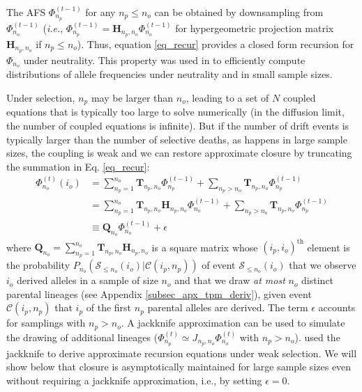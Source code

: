 \documentclass[review,nonatbib]{elsarticle}
\newcommand{\afs}[2]{\Phi_{#1}^{(#2)}}
\newcommand{\ms}{\mathcal{S}}
\begin{document}
The AFS  $\afs{n_p}{t-1}$ for any  $n_p\leq n_o$ can be obtained by downsampling from $\afs{n_o}{t-1}$ (\textit{i.e.}, $\afs{n_p}{t-1} =
\mathbf{H}_{n_p,n_o} \afs{n_o}{t-1}$ for hypergeometric projection matrix $\mathbf{H}_{n_p,n_o}$ if
$n_p\leq n_o$). Thus, equation \eqref{eq_recur} provides a closed form recursion for $\Phi_{n_o}$ under neutrality.
This property was used in \cite{JouganousEtAl2017} to efficiently compute distributions of allele
frequencies under neutrality and in small sample sizes.

Under selection, $n_{p}$ may be larger than $n_o$, leading to a set of $N$ coupled equations that is
typically too large to solve numerically (in the diffusion limit, the number of coupled equations is
infinite). But if the number of drift events is typically larger than the number of selective
deaths, as happens in large sample sizes, the coupling is weak and we can restore approximate
closure by truncating the summation in Eq. \ref{eq_recur}:
\begin{equation}
\begin{split}
  \afs{n_o}{t}(i_o)
  &= \sum_{n_p=1}^{n_{o}} \mathbf{T}_{n_p,n_o}  \afs{n_p}{t-1}+ \sum_{n_p> n_o }  \mathbf{T}_{n_p,n_o} \afs{n_p}{t-1} \\
  &=      \sum_{n_p=1}^{n_{o}} \mathbf{T}_{n_p,n_o} \mathbf{H}_{n_p,n_o} \afs{n_o}{t-1}+ \sum_{n_p> n_o }  \mathbf{T}_{n_p,n_o} \afs{n_p}{t-1} \\
  &\equiv \mathbf{Q}_{n_o}                                               \afs{n_o}{t-1}+\epsilon
\end{split}
\label{eq_truncated}
\end{equation}
where $\mathbf{Q}_{n_o} =  \sum_{n_p=1}^{n_{o}} \mathbf{T}_{n_p,n_o} \mathbf{H}_{n_p,n_o}$ is a square matrix
whose $(i_p,i_o)^\text{th}$ element is the probability
$P_{n_o}(\mathcal{S}_{\leq n_o} (i_o)| \mathcal{C}(i_p,n_p))$ of event $\ms_{\leq n_o}(i_o)$ that we observe $i_o$ derived alleles in
a sample of size $n_o$ and that we draw \emph{at most} $n_o$ distinct parental lineages (see Appendix \ref{subsec_apx_tpm_deriv}), 
given event $\mathcal{C}(i_p,n_p)$ that $i_p$ of the first $n_p$ parental alleles are derived.
The term $\epsilon$ accounts for samplings with $n_p>n_o.$ A jackknife approximation \citep{Gravel2016} can be used to simulate the drawing of additional lineages
($\afs{n_p}{t} \simeq J_{n_p,n_o} \afs{n_o}{t}$ with $n_p>n_o$). \cite{JouganousEtAl2017} used the
jackknife to derive approximate recursion equations under weak selection. We will show below that
closure is asymptotically maintained for large sample sizes even without requiring a jackknife
approximation, i.e., by setting $\epsilon=0$. 
\end{document}
